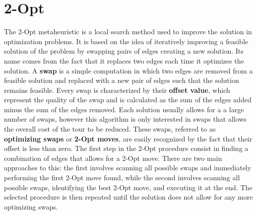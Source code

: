 \section{2-Opt}
The 2-Opt metaheuristic is a local search method used to improve the solution in optimization problems.
It is based on the idea of iteratively improving a feasible solution of the problem by swapping pairs of edges creating a new solution.
Its name comes from the fact that it replaces two edges each time it optimizes the solution.
A \textbf{swap} is a simple computation in which two edges are removed from a feasible solution and replaced with a new pair of edges such that the solution remains feasible.
Every swap is characterized by their \textbf{offset value}, which represent the quality of the swap and is calculated as the sum of the edges added minus the sum of the edges removed.
Each solution usually allows for a a large number of swaps, however this algorithm is only interested in swaps that allows the overall cost of the tour to be reduced.
These swaps, referred to as \textbf{optimizing swaps} or \textbf{2-Opt moves}, are easily recognized by the fact that their offset is less than zero.
The first step in the 2-Opt procedure consist in finding a combination of edges that allows for a 2-Opt move.
There are two main approaches to this: the first involves scanning all possible swaps and immediately performing the first 2-Opt move found, while the second involves scanning all possible swaps, identifying the best 2-Opt move, and executing it at the end.
The selected procedure is then repeated until the solution does not allow for any more optimizing swaps.

